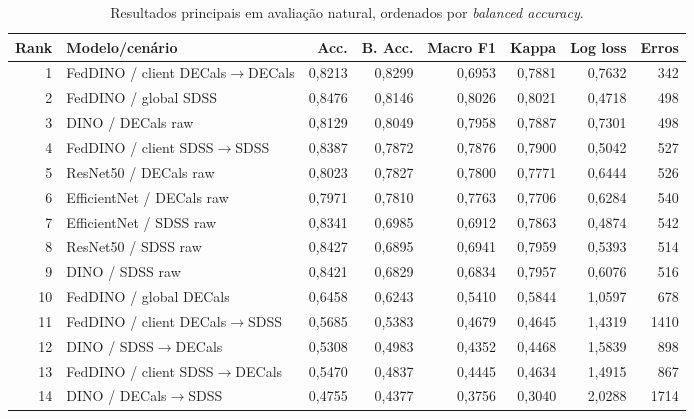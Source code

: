 \documentclass[conference]{IEEEtran}
\begin{document}
\begin{table}[!htb]
    \centering
    \caption{Resultados principais em avaliação natural, ordenados por \textit{balanced accuracy}.}
    \label{tab:robust_results}
    \vspace{-1.5mm}
    \scriptsize
    \begin{tabular}{rlrrrrrr}
        \toprule
        \textbf{Rank} & \textbf{Modelo/cenário} & \textbf{Acc.} & \textbf{B. Acc.} & \textbf{Macro F1} & \textbf{Kappa} & \textbf{Log loss} & \textbf{Erros} \\
        \midrule
        1 & FedDINO / client DECals$\rightarrow$DECals & 0,8213 & 0,8299 & 0,6953 & 0,7881 & 0,7632 & 342 \\
        2 & FedDINO / global SDSS & 0,8476 & 0,8146 & 0,8026 & 0,8021 & 0,4718 & 498 \\
        3 & DINO / DECals raw & 0,8129 & 0,8049 & 0,7958 & 0,7887 & 0,7301 & 498 \\
        4 & FedDINO / client SDSS$\rightarrow$SDSS & 0,8387 & 0,7872 & 0,7876 & 0,7900 & 0,5042 & 527 \\
        5 & ResNet50 / DECals raw & 0,8023 & 0,7827 & 0,7800 & 0,7771 & 0,6444 & 526 \\
        6 & EfficientNet / DECals raw & 0,7971 & 0,7810 & 0,7763 & 0,7706 & 0,6284 & 540 \\
        7 & EfficientNet / SDSS raw & 0,8341 & 0,6985 & 0,6912 & 0,7863 & 0,4874 & 542 \\
        8 & ResNet50 / SDSS raw & 0,8427 & 0,6895 & 0,6941 & 0,7959 & 0,5393 & 514 \\
        9 & DINO / SDSS raw & 0,8421 & 0,6829 & 0,6834 & 0,7957 & 0,6076 & 516 \\
        10 & FedDINO / global DECals & 0,6458 & 0,6243 & 0,5410 & 0,5844 & 1,0597 & 678 \\
        11 & FedDINO / client DECals$\rightarrow$SDSS & 0,5685 & 0,5383 & 0,4679 & 0,4645 & 1,4319 & 1410 \\
        12 & DINO / SDSS$\rightarrow$DECals & 0,5308 & 0,4983 & 0,4352 & 0,4468 & 1,5839 & 898 \\
        13 & FedDINO / client SDSS$\rightarrow$DECals & 0,5470 & 0,4837 & 0,4445 & 0,4634 & 1,4915 & 867 \\
        14 & DINO / DECals$\rightarrow$SDSS & 0,4755 & 0,4377 & 0,3756 & 0,3040 & 2,0288 & 1714 \\
        \bottomrule
    \end{tabular}
\end{table}
\end{document}
